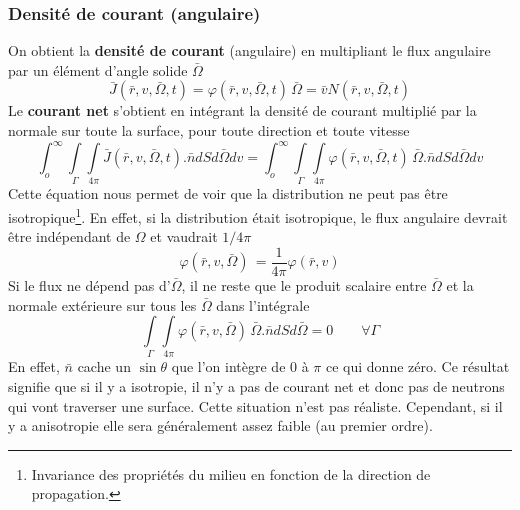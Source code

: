 \subsubsection{Densité de courant (angulaire)}
On obtient la \textbf{densité de courant} (angulaire) en multipliant le flux angulaire par un élément d'angle solide 
$\bar\Omega$
\begin{equation}
\bar J(\bar r,v,\bar \Omega ,t) = \varphi (\bar r,v,\bar \Omega ,t)\,\bar \Omega  = \bar vN(\bar r,v,\bar \Omega ,t)
\end{equation}
Le \textbf{courant net} s'obtient en intégrant la densité de courant multiplié par la normale sur 
toute la surface, pour toute direction et toute vitesse
\begin{equation}
\int_o^\infty     \int\limits_\Gamma  {\int\limits_{4\pi }    } \bar J(\bar r,v,\bar \Omega ,t).\bar ndSd\bar \Omega dv = \int_o^\infty     \int\limits_\Gamma  {\int\limits_{4\pi }   } \varphi (\bar r,v,\bar \Omega ,t)\,\bar \Omega .\bar ndSd\bar \Omega dv
\end{equation}
Cette équation nous permet de voir que la distribution ne peut pas être 
isotropique\footnote{Invariance des propriétés du milieu en fonction de la direction de propagation.}.
En effet, si la distribution était isotropique, le flux angulaire devrait être indépendant de 
$\Omega$ et vaudrait $1/4\pi$
\begin{equation}
\varphi (\bar r,v,\bar \Omega )\, = \frac{1}{{4\pi }}\varphi (\bar r,v)
\end{equation}
Si le flux ne dépend pas d'$\bar\Omega$, il ne reste que le produit scalaire entre $\bar\Omega$ et 
la normale extérieure sur tous les $\bar\Omega$ dans l'intégrale
\begin{equation}
\int\limits_\Gamma  {\int\limits_{4\pi }    } \varphi (\bar r,v,\bar \Omega )\,\bar \Omega .\bar ndSd\bar \Omega  = 0\qquad \forall \Gamma 
\end{equation}
En effet, $\bar n$ cache un $\sin\theta$ que l'on intègre de 0 à $\pi$ ce qui donne zéro. Ce 
résultat signifie que si il y a isotropie, il n'y a pas de courant net et donc pas de neutrons qui 
vont traverser une surface. Cette situation n'est pas réaliste. Cependant, si il y a anisotropie elle 
sera généralement assez faible (au premier ordre).


